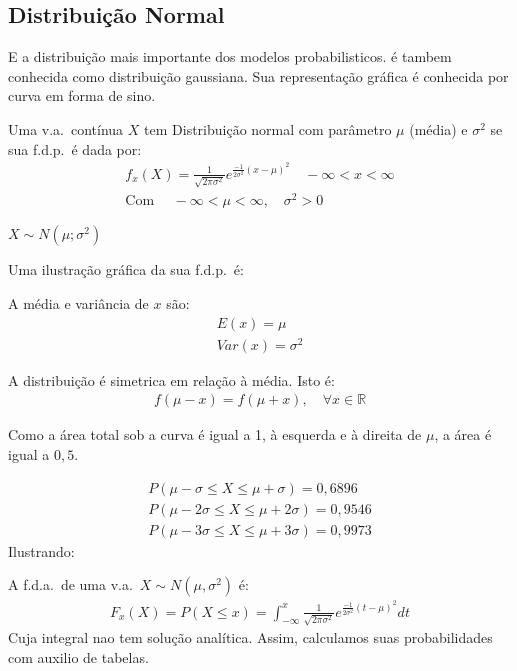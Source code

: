 \subsection{Distribuição Normal}
E a distribuição mais importante dos modelos probabilisticos. 
é tambem conhecida como distribuição gaussiana. Sua representação 
gráfica é conhecida por curva em forma de sino.
\begin{description}
  \item [Definição:]  Uma v.a.\ contínua $X$ tem Distribuição normal com parâmetro $\mu$ (média) e 
    $\sigma^2$ se sua f.d.p.\ é dada por:
    \begin{align}
      f_{x} (X)= \frac{1}{\sqrt{2\pi \sigma^2}} e^{\frac{-1}{2\sigma^2} \left( x-\mu \right)^2} \quad -\infty<x<\infty \\
      \text{Com } \quad -\infty < \mu < \infty, \quad \sigma^2>0
    \end{align}
  \item [Notação:] $X \sim N(\mu ; \sigma^2)$

Uma ilustração gráfica da sua f.d.p.\ é:
\begin{figure}[H]
  \centering
  
\end{figure}
A média e variância de $x$ são:
\begin{align*}
E(x) =\mu \\
Var(x)=\sigma^2
\end{align*}
\item [Propriedades:]
A distribuição é simetrica em relação à média. Isto é:
\begin{align}
  f(\mu - x) = f(\mu+x), \quad \forall x \in \mathbb{R}
\end{align}
\item Como a área total sob a curva é igual a 1, à esquerda e à direita de $\mu$, 
  a área é igual a $0,5$.
\item 
  \begin{align*}
    P(\mu -\sigma \leq X \leq \mu+\sigma)= 0,6896\\
    P(\mu -2\sigma \leq X \leq \mu+2\sigma)= 0,9546\\
    P(\mu -3\sigma \leq X \leq \mu+3\sigma)= 0,9973
  \end{align*}
Ilustrando:
\begin{figure}[H]
  \centering
  
\end{figure}
A f.d.a.\ de uma v.a.\ $X \sim N(\mu,\sigma^2)$ é:
\begin{align*}
  F_{x} (X)= P(X \leq x)= \int^{x}_{-\infty} \frac{1}{\sqrt{2\pi \sigma^2}}e^{\frac{-1}{2\sigma^2} \left( t- \mu \right)^2} dt 
\end{align*}
Cuja integral nao tem solução analítica. Assim, calculamos suas probabilidades com auxilio de tabelas.


\end{description}

